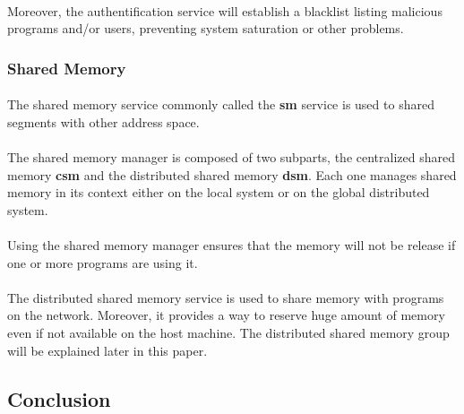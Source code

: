 \documentclass[10pt,a4wide]{article}
\begin{document}
\begin{multicols}{2}
\paragraph{}

Moreover, the authentification service will establish a blacklist listing
malicious programs and/or users, preventing system saturation or other
problems.

\subsubsection{Shared Memory}

\paragraph{}

The shared memory service commonly called the \textbf{sm} service is used
to shared segments with other address space.

\paragraph{}

The shared memory manager is composed of two subparts, the centralized
shared memory \textbf{csm} and the distributed shared memory \textbf{dsm}.
Each one manages shared memory in its context either on the local system
or on the global distributed system.

\paragraph{}

Using the shared memory manager ensures that the memory will not be release
if one or more programs are using it.

\paragraph{}

The distributed shared memory service is used to share memory with
programs on the network. Moreover, it provides a way to reserve huge amount
of memory even if not available on the host machine. The distributed shared
memory group will be explained later in this paper.

\subsection{Conclusion}


\end{multicols}
\end{document}
